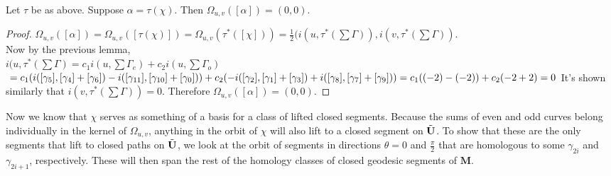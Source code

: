 \documentclass[a4paper, 11pt]{article}
\def\bM{\mathbf{M}}
\begin{document}
\begin{thm}
Let $\tau$ be as above. Suppose $\alpha=\tau(\chi)$. Then $\Omega_{u,v}([\alpha])=(0,0)$. 
\begin{proof}
$\Omega_{u,v}([\alpha])=\Omega_{u,v}([\tau(\chi)])=\Omega_{u,v}(\tau^{*}([\chi]))=\frac{1}{2}(i(u,\tau^*(\sum\Gamma)), i(v,\tau^*(\sum\Gamma))$.\\
Now by the previous lemma, \\$i(u,\tau^*(\sum\Gamma)=c_1 i(u,\sum
\Gamma_e)+c_2 i(u,\sum\Gamma_o)$ $\\= c_1(i([\gamma_5],[\gamma_{4}]+[\gamma_6]) - i([\gamma_{11}],[\gamma_{10}]+[\gamma_{0}]))\\+c_2(-i([\gamma_2],[\gamma_{1}]+[\gamma_{3}]) + i([\gamma_8],[\gamma_{7}]+[\gamma_{9}]) )\\=c_1((-2)-(-2))+c_2(-2+ 2 )=0\\$
It's shown similarly that $i(v,\tau^*(\sum\Gamma))=0$.
Therefore $\Omega_{u,v}([\alpha])=(0,0)$.
\end{proof}
\end{thm}

Now we know that $\chi$ serves as something of a basis for a class of lifted closed segments. Because the sums of even and odd curves belong individually in the kernel of $\Omega_{u,v}$, anything in the orbit of $\chi$ will also lift to a closed segment on $\tilde{\mathbf{U}}$. To show that these are the only segments that lift to closed paths on $\tilde{\mathbf{U}}$, we look at the orbit of segments in directions $\theta=0$ and $\frac{\pi}{2}$ that are homologous to some $\gamma_{2i}$ and $\gamma_{2i+1}$, respectively. These will then span the rest of the homology classes of closed geodesic segments of $\bM$. 
\end{document}
